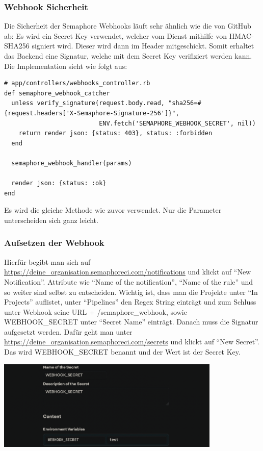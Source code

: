 \subsubsection{Webhook Sicherheit}
Die Sicherheit der Semaphore Webhooks läuft sehr ähnlich wie die von GitHub ab: Es wird ein Secret Key verwendet,
welcher vom Dienst mithilfe von HMAC-SHA256 signiert wird. Dieser wird dann im Header mitgeschickt. Somit erhaltet
das Backend eine Signatur, welche mit dem Secret Key verifiziert werden kann. \newline
Die Implementation sieht wie folgt aus:
\begin{codebox}[]
  \begin{verbatim}
# app/controllers/webhooks_controller.rb
def semaphore_webhook_catcher
  unless verify_signature(request.body.read, "sha256=#{request.headers['X-Semaphore-Signature-256']}",
                          ENV.fetch('SEMAPHORE_WEBHOOK_SECRET', nil))
    return render json: {status: 403}, status: :forbidden
  end

  semaphore_webhook_handler(params)

  render json: {status: :ok}
end
  \end{verbatim}
\end{codebox}
Es wird die gleiche  Methode wie zuvor verwendet. Nur die Parameter
unterscheiden sich ganz leicht.

\subsubsection{Aufsetzen der Webhook}
Hierfür begibt man sich auf \url{https://deine_organisation.semaphoreci.com/notifications} und klickt auf 
\enquote{New Notification}. Attribute wie \enquote{Name of the notification}, \enquote{Name of the rule} und so weiter
sind selbst zu entscheiden. Wichtig ist, dass man die Projekte unter \enquote{In Projects} auflistet, unter 
\enquote{Pipelines} den Regex String  einträgt und zum Schluss unter Webhook
seine URL + /semaphore\_webhook, sowie WEBHOOK\_SECRET unter \enquote{Secret Name} einträgt. \newline
Danach muss die Signatur aufgesetzt werden. Dafür geht man unter
\url{https://deine_organisation.semaphoreci.com/secrets} und klickt auf \enquote{New Secret}. Das wird WEBHOOK\_SECRET
benannt und der Wert ist der Secret Key.
\begin{center}
  \includegraphics[width=0.8\textwidth]{images/misc/setup_semaphore_webhook.png}
  \label{fig:setup_semaphore_webhook}
\end{center}


